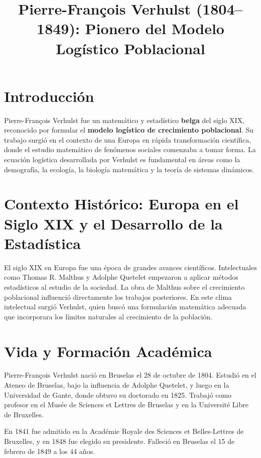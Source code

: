 \documentclass[12pt]{article}
\title{Pierre-François Verhulst (1804–1849): Pionero del Modelo Logístico Poblacional}
\author{}
\date{}
\begin{document}
\maketitle

\tableofcontents
\newpage

\section{Introducción}

Pierre-François Verhulst fue un matemático y estadístico \textbf{belga} del siglo XIX, reconocido por formular el \textbf{modelo logístico de crecimiento poblacional}. Su trabajo surgió en el contexto de una Europa en rápida transformación científica, donde el estudio matemático de fenómenos sociales comenzaba a tomar forma. La ecuación logística desarrollada por Verhulst es fundamental en áreas como la demografía, la ecología, la biología matemática y la teoría de sistemas dinámicos.

\section{Contexto Histórico: Europa en el Siglo XIX y el Desarrollo de la Estadística}

El siglo XIX en Europa fue una época de grandes avances científicos. Intelectuales como Thomas R. Malthus y Adolphe Quetelet empezaron a aplicar métodos estadísticos al estudio de la sociedad. La obra de Malthus sobre el crecimiento poblacional influenció directamente los trabajos posteriores. En este clima intelectual surgió Verhulst, quien buscó una formulación matemática adecuada que incorporara los límites naturales al crecimiento de la población.

\section{Vida y Formación Académica}

Pierre-François Verhulst nació en Bruselas el 28 de octubre de 1804. Estudió en el Ateneo de Bruselas, bajo la influencia de Adolphe Quetelet, y luego en la Universidad de Gante, donde obtuvo su doctorado en 1825. Trabajó como profesor en el Musée de Sciences et Lettres de Bruselas y en la Université Libre de Bruxelles.

En 1841 fue admitido en la Académie Royale des Sciences et Belles-Lettres de Bruxelles, y en 1848 fue elegido su presidente. Falleció en Bruselas el 15 de febrero de 1849 a los 44 años.
\end{document}
